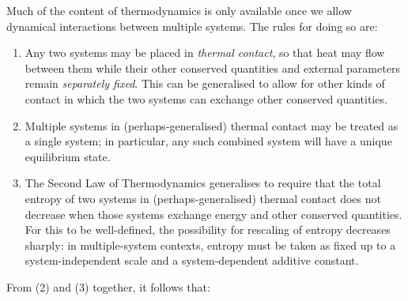 \documentclass[12pt]{article}
\begin{document}
Much of the content of thermodynamics is only available once we allow dynamical interactions between multiple systems. The rules for doing so are:
\begin{enumerate}
\item Any two systems may be placed in \emph{thermal contact}, so that heat may flow between them while their other conserved quantities and external parameters remain \emph{separately fixed}. This can be generalised to allow for other kinds of contact in which the two systems can exchange other conserved quantities.
\item Multiple systems in (perhaps-generalised) thermal contact may be treated as a single system; in particular, any such combined system will have a unique equilibrium state.
\item The Second Law of Thermodynamics generalises to require that the total entropy of two systems in (perhaps-generalised) thermal contact does not decrease when those systems exchange energy and other conserved quantities. For this to be well-defined, the possibility for rescaling of entropy decreases sharply: in multiple-system contexts, entropy must be taken as fixed up to a system-independent scale and a system-dependent additive constant. 
\end{enumerate}
From (2) and (3) together, it follows that:
\end{document}
